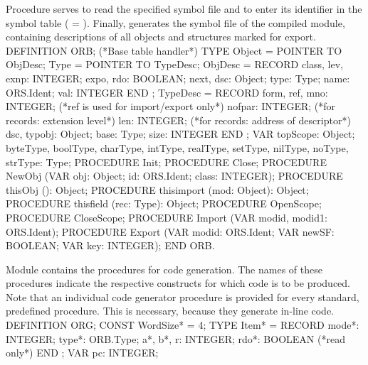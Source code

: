 Procedure  serves to read the specified symbol file and to enter its identifier in the symbol table ( = ). Finally,  generates the symbol file of the compiled module, containing descriptions of all objects and structures marked for export.
\begintt
DEFINITION ORB; (*Base table handler*)
  TYPE
    Object = POINTER TO ObjDesc;
    Type = POINTER TO TypeDesc;
    ObjDesc = RECORD
      class, lev, exnp: INTEGER;
      expo, rdo: BOOLEAN;
      next, dsc: Object;
      type: Type;
      name: ORS.Ident;
      val: INTEGER
    END ;
    TypeDesc = RECORD
      form, ref, mno: INTEGER; (*ref is used for import/export only*)
      nofpar: INTEGER; (*for records: extension level*)
      len: INTEGER; (*for records: address of descriptor*)
      dsc, typobj: Object;
      base: Type;
      size: INTEGER
    END ;
  VAR topScope: Object;
    byteType, boolType, charType, intType, realType, setType,
    nilType, noType, strType: Type;
  PROCEDURE Init;
  PROCEDURE Close;
  PROCEDURE NewObj (VAR obj: Object; id: ORS.Ident; class: INTEGER);
  PROCEDURE thisObj (): Object;
  PROCEDURE thisimport (mod: Object): Object;
  PROCEDURE thisfield (rec: Type): Object;
  PROCEDURE OpenScope;
  PROCEDURE CloseScope;
  PROCEDURE Import (VAR modid, modid1: ORS.Ident);
  PROCEDURE Export (VAR modid: ORS.Ident;
                    VAR newSF: BOOLEAN; VAR key: INTEGER);
END ORB.
\endtt

\noindent Module  contains the procedures for code generation. The names of these procedures indicate the respective constructs for which code is to be produced. Note that an individual code generator procedure is provided for every standard, predefined procedure. This is necessary, because they generate in-line code.
\begintt
DEFINITION ORG;
  CONST WordSize* = 4;
  TYPE Item* = RECORD
    mode*: INTEGER;
    type*: ORB.Type;
    a*, b*, r: INTEGER;
    rdo*: BOOLEAN (*read only*)
  END ;
  VAR pc: INTEGER;
  
